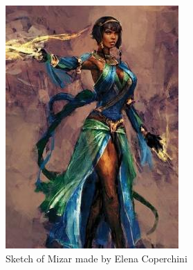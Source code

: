 \hfill\begin{minipage}{0.4\textwidth}
  \begin{figure}[H]
  \includegraphics{Images/Characters/mizar}
  \caption{Sketch of Mizar made by Elena Coperchini}
\end{figure}
\end{minipage}






